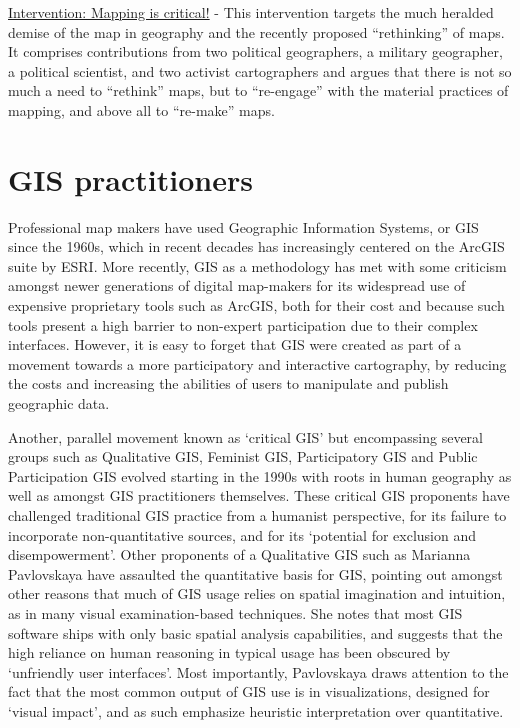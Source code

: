 \documentclass[11pt]{report}
\begin{document}
\href{http://www.sciencedirect.com/science?_ob=ArticleURL&_udi=B6VG2-4XHJX4B-1&_user=10&_coverDate=08/31/2009&_rdoc=1&_fmt=high&_orig=search&_sort=d&_docanchor=&view=c&_searchStrId=1186930669&_rerunOrigin=google&_acct=C000050221&_version=1&_urlVersion=0&_userid=10&md5=a9327ffa62e089e863f892a4551c1717}{Intervention: Mapping is critical!} - This intervention targets the much heralded demise of the map in geography and the recently proposed “rethinking” of maps. It comprises contributions from two political geographers, a military geographer, a political scientist, and two activist cartographers and argues that there is not so much a need to “rethink” maps, but to “re-engage” with the material practices of mapping, and above all to “re-make” maps.

\section{GIS practitioners}
\label{sec:gis}

Professional map makers have used Geographic Information Systems, or GIS since the 1960s, which in recent decades has increasingly centered on the ArcGIS suite by ESRI. More recently, GIS as a methodology has met with some criticism amongst newer generations of digital map-makers for its widespread use of expensive proprietary tools such as ArcGIS, both for their cost and because such tools present a high barrier to non-expert participation due to their complex interfaces. However, it is easy to forget that GIS were created as part of a movement towards a more participatory and interactive cartography, by reducing the costs and increasing the abilities of users to manipulate and publish geographic data.

Another, parallel movement known as `critical GIS' but encompassing several groups such as Qualitative GIS, Feminist GIS, Participatory GIS and Public Participation GIS evolved starting in the 1990s with roots in human geography as well as amongst GIS practitioners themselves. These critical GIS proponents have challenged traditional GIS practice from a humanist perspective, for its failure to incorporate non-quantitative sources, and for its `potential for exclusion and disempowerment'\cite{elwood2009qualitative}. Other proponents of a Qualitative GIS such as Marianna Pavlovskaya have assaulted the quantitative basis for GIS, pointing out amongst other reasons that much of GIS usage relies on spatial imagination and intuition, as in many visual examination-based techniques. She notes that most GIS software ships with only basic spatial analysis capabilities, and suggests that the high reliance on human reasoning in typical usage has been obscured by `unfriendly user interfaces'. Most importantly, Pavlovskaya draws attention to the fact that the most common output of GIS use is in visualizations, designed for `visual impact', and as such emphasize heuristic interpretation over quantitative.\cite{pavlovskaya2009nonquantitative} 
\end{document}
